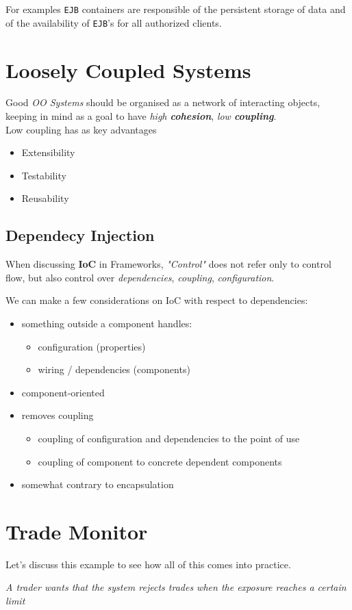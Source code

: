 For examples \texttt{EJB} containers are responsible of the
persistent storage of data and of the availability of
\texttt{EJB}’s for all authorized clients.

\section{Loosely Coupled Systems}
Good \textit{OO Systems} should be organised as
a network of interacting objects,
keeping in mind as a goal to have \textit{high \textbf{cohesion}}, \textit{low \textbf{coupling}}.\\
Low coupling has as key advantages
\begin{itemize}
   \item Extensibility
   \item Testability
   \item Reusability
\end{itemize}

\subsection{Dependecy Injection}
When discussing \textbf{IoC} in Frameworks, \textit{"Control"} does not refer only to control flow, but also control over \textit{dependencies}, \textit{coupling}, \textit{configuration}.

We can make a few considerations on IoC with respect to dependencies:
\begin{itemize}
   \item something outside a component handles:
   \begin{itemize}
      \item configuration (properties)
      \item wiring / dependencies (components)
   \end{itemize}
   \item component-oriented
   \item removes coupling
   \begin{itemize}
      \item coupling of configuration and dependencies to the point of use
      \item coupling of component to concrete dependent components
   \end{itemize}
   \item somewhat contrary to encapsulation
\end{itemize}

\section{Trade Monitor}
Let's discuss this example to see how all of this comes into practice.
\begin{center}
   \textit{A trader wants that the system rejects trades when the exposure reaches a certain limit}
\end{center}

